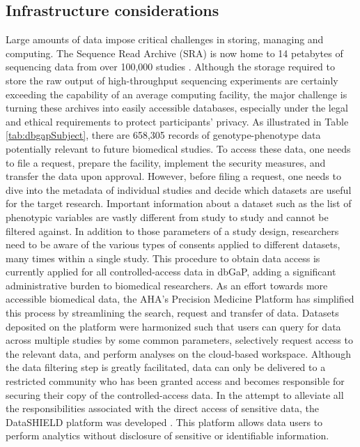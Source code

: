 \documentclass[letter]{bioinfo}
\begin{document}
	
	\subsection*{Infrastructure considerations}
	Large amounts of data impose critical challenges in storing, managing and computing. The Sequence Read Archive (SRA) \citep{Leinonen:2011:Sequence} is now home to 14 petabytes of sequencing data from over 100,000 studies \citep{Langmead:2018:Cloud}.
	Although the storage required to store the raw output of high-throughput sequencing experiments are certainly exceeding the capability of an average computing facility, the major challenge is turning these archives into easily accessible databases, especially under the legal and ethical requirements to protect participants' privacy.
	As illustrated in Table \ref{tab:dbgapSubject}, there are 658,305 records of genotype-phenotype data potentially relevant to future biomedical studies. To access these data, one needs to file a request, prepare the facility, implement the security measures, and transfer the data upon approval. However, before filing a request, one needs to dive into the metadata of individual studies and decide which datasets are useful for the target research. Important information about a dataset such as the list of phenotypic variables are vastly different from study to study and cannot be filtered against. In addition to those parameters of a study design, researchers need to be aware of the various types of consents applied to different datasets, many times within a single study. This procedure to obtain data access is currently applied for all controlled-access data in dbGaP, adding a significant administrative burden to biomedical researchers.
	As an effort towards more accessible biomedical data, the AHA's Precision Medicine Platform \citep{Kass-Hout:2018:American} has simplified this process by streamlining the search, request and transfer of data. Datasets deposited on the platform were harmonized such that users can query for data across multiple studies by some common parameters, selectively request access to the relevant data, and perform analyses on the cloud-based workspace.
	Although the data filtering step is greatly facilitated, data can only be delivered to a restricted community who has been granted access and becomes responsible for securing their copy of the controlled-access data. In the attempt to alleviate all the responsibilities associated with the direct access of sensitive data, the DataSHIELD platform was developed \citep{Gaye:2014:DataSHIELD, Wilson:2017:DataSHIELD}. This platform allows data users to perform analytics without disclosure of sensitive or identifiable information.
\end{document}
